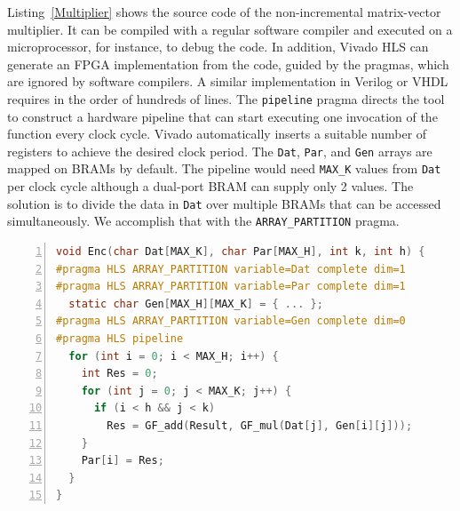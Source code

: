 Listing~\ref{Multiplier} shows the source code of the non-incremental
matrix-vector multiplier.  It can be compiled with a regular software
compiler and executed on a microprocessor, for instance, to debug the code.
In addition, Vivado HLS can generate an FPGA implementation
from the code, guided by the pragmas, which are ignored by software compilers.
A similar implementation in Verilog or VHDL requires in the order of hundreds
of lines.  The {\tt pipeline} pragma directs the tool to construct a
hardware pipeline that can start executing one invocation of the function
every clock cycle.  Vivado automatically inserts a suitable number of registers
to achieve the desired clock period.
The {\tt Dat}, {\tt Par}, and {\tt Gen} arrays are mapped
on BRAMs by default.  The pipeline would need {\tt MAX\_K} values from {\tt Dat}
per clock cycle although a dual-port BRAM can supply only 2 values.  The
solution is to divide the data in {\tt Dat} over multiple BRAMs that can be
accessed simultaneously.  We accomplish that with the {\tt ARRAY\_PARTITION}
pragma.

\begin{lstlisting}[language=C,basicstyle=\footnotesize,numbers=left,
                   captionpos=b,caption={Matrix-Vector Multiplier},
                   label=Multiplier]
void Enc(char Dat[MAX_K], char Par[MAX_H], int k, int h) {
#pragma HLS ARRAY_PARTITION variable=Dat complete dim=1
#pragma HLS ARRAY_PARTITION variable=Par complete dim=1
  static char Gen[MAX_H][MAX_K] = { ... };
#pragma HLS ARRAY_PARTITION variable=Gen complete dim=0
#pragma HLS pipeline
  for (int i = 0; i < MAX_H; i++) {
    int Res = 0;
    for (int j = 0; j < MAX_K; j++) {
      if (i < h && j < k)
        Res = GF_add(Result, GF_mul(Dat[j], Gen[i][j]));
    }
    Par[i] = Res;
  }
}
\end{lstlisting}

